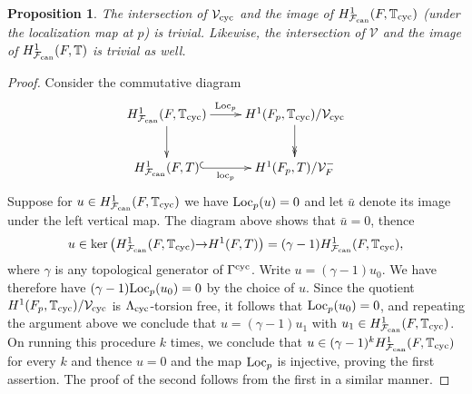 \documentclass[12pt]{amsart}
\numberwithin{equation}{section}
\newtheorem{prop}[thm]{Proposition}
\begin{document}
\begin{prop}
\label{prop:canliftfromthegroundlevel} 
The intersection of $\mathcal{V}_{\textup{cyc}}$ and the image of $H^1_{\mathcal{F}_{\textup{\lowercase{can}}}}(F,{\mathbb{T}}_{\textup{cyc}})$ (under the localization map at $p$) is trivial. Likewise, the intersection of $\mathcal{V}$ and the image of $H^1_{\mathcal{F}_{\textup{\lowercase{can}}}}(F,{\mathbb{T}})$  is trivial as well.
\end{prop}
\begin{proof}
Consider the commutative diagram
$$\xymatrix{H^1_{\mathcal{F}_{\textup{\lowercase{can}}}}(F,{\mathbb{T}}_{\textup{cyc}})\ar[r]^(.46){\textup{Loc}_p}\ar[d]& H^1(F_p,{\mathbb{T}}_{\textup{cyc}})/\mathcal{V}_{\textup{cyc}}\ar@{->>}[d]\\
H^1_{\mathcal{F}_{\textup{\lowercase{can}}}}(F,T)\ar@{^{(}->}[r]_(.46){\textup{loc}_p}&H^1(F_p,T)/\mathcal{V}_F^-
}$$
Suppose for $u \in H^1_{\mathcal{F}_{\textup{\lowercase{can}}}}(F,{\mathbb{T}}_{\textup{cyc}})$ we have $\textup{Loc}_p(u)=0$ and let $\bar{u}$ denote its image under the left vertical map. The diagram above shows that $\bar{u}=0$, thence 
$$u\in \ker\left(H^1_{\mathcal{F}_{\textup{\lowercase{can}}}}(F,{\mathbb{T}}_{\textup{cyc}}){\rightarrow} H^1(F,T)\right)=(\gamma-1)H^1_{\mathcal{F}_{\textup{\lowercase{can}}}}(F,{\mathbb{T}}_{\textup{cyc}}),$$ 
where $\gamma$ is any topological generator of $\Gamma^{\textup{cyc}}$. Write $u=(\gamma-1)u_0$. We have therefore have $(\gamma-1)\textup{Loc}_p(u_0)=0$ by the choice of $u$. Since the quotient $H^1(F_p,{\mathbb{T}}_{\textup{cyc}})/\mathcal{V}_{\textup{cyc}}$ is ${\Lambda}_{\textup{cyc}}$-torsion free, it follows that $\textup{Loc}_p(u_0)=0$, and repeating the argument above we conclude that $u=(\gamma-1)u_1$ with $u_1\in H^1_{\mathcal{F}_{\textup{\lowercase{can}}}}(F,{\mathbb{T}}_{\textup{cyc}})$. On running this procedure $k$ times, we conclude that $u\in (\gamma-1)^kH^1_{\mathcal{F}_{\textup{\lowercase{can}}}}(F,{\mathbb{T}}_{\textup{cyc}})$ for every $k$ and thence $u=0$ and the map $\textup{Loc}_p$ is injective, proving the first assertion. The proof of the second follows from the first in a  similar manner.
\end{proof}
\end{document}
